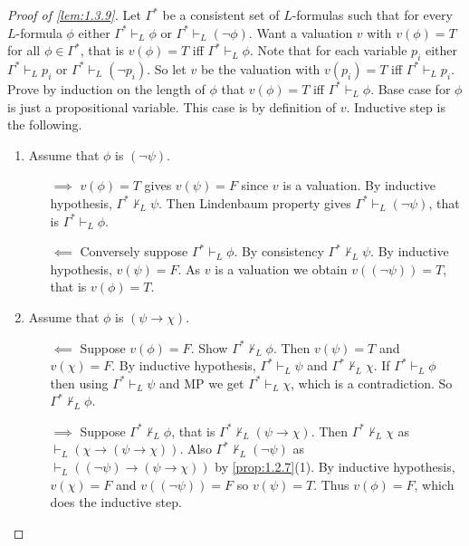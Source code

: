 \documentclass{article}
\newcommand{\rb}[1]{\left( #1 \right)}
\newcommand{\notb}[1]{\rb{\neg #1}}
\newcommand{\impb}[2]{\rb{#1 \rightarrow #2}}
\theoremstyle{definition}\newtheorem{definition}{Definition}[subsection]
\theoremstyle{definition}\newtheorem{remark}[definition]{Remark}
\theoremstyle{definition}\newtheorem*{example}{Example}
\theoremstyle{definition}\newtheorem*{note}{Note}
\begin{document}
\begin{proof}[Proof of \ref{lem:1.3.9}]
Let $ \Gamma^* $ be a consistent set of $ L $-formulas such that for every $ L $-formula $ \phi $ either $ \Gamma^* \vdash_L \phi $ or $ \Gamma^* \vdash_L \notb{\phi} $. Want a valuation $ v $ with $ v\rb{\phi} = T $ for all $ \phi \in \Gamma^* $, that is $ v\rb{\phi} = T $ iff $ \Gamma^* \vdash_L \phi $. Note that for each variable $ p_i $ either $ \Gamma^* \vdash_L p_i $ or $ \Gamma^* \vdash_L \notb{p_i} $. So let $ v $ be the valuation with $ v\rb{p_i} = T $ iff $ \Gamma^* \vdash_L p_i $. Prove by induction on the length of $ \phi $ that $ v\rb{\phi} = T $ iff $ \Gamma^* \vdash_L \phi $. Base case for $ \phi $ is just a propositional variable. This case is by definition of $ v $. Inductive step is the following.
\begin{enumerate}
\item Assume that $ \phi $ is $ \notb{\psi} $.
\begin{itemize}
\item[$ \implies $] $ v\rb{\phi} = T $ gives $ v\rb{\psi} = F $ since $ v $ is a valuation. By inductive hypothesis, $ \Gamma^* \not\vdash_L \psi $. Then Lindenbaum property gives $ \Gamma^* \vdash_L \notb{\psi} $, that is $ \Gamma^* \vdash_L \phi $.
\item[$ \impliedby $] Conversely suppose $ \Gamma^* \vdash_L \phi $. By consistency $ \Gamma^* \not\vdash_L \psi $. By inductive hypothesis, $ v\rb{\psi} = F $. As $ v $ is a valuation we obtain $ v\rb{\notb{\psi}} = T $, that is $ v\rb{\phi} = T $.
\end{itemize}
\item Assume that $ \phi $ is $ \impb{\psi}{\chi} $.
\begin{itemize}
\item[$ \impliedby $] Suppose $ v\rb{\phi} = F $. Show $ \Gamma^* \not\vdash_L \phi $. Then $ v\rb{\psi} = T $ and $ v\rb{\chi} = F $. By inductive hypothesis, $ \Gamma^* \vdash_L \psi $ and $ \Gamma^* \not\vdash_L \chi $. If $ \Gamma^* \vdash_L \phi $ then using $ \Gamma^* \vdash_L \psi $ and MP we get $ \Gamma^* \vdash_L \chi $, which is a contradiction. So $ \Gamma^* \not\vdash_L \phi $.
\item[$ \implies $] Suppose $ \Gamma^* \not\vdash_L \phi $, that is $ \Gamma^* \not\vdash_L \impb{\psi}{\chi} $. Then $ \Gamma^* \not\vdash_L \chi $ as $ \vdash_L \impb{\chi}{\impb{\psi}{\chi}} $. Also $ \Gamma^* \not\vdash_L \notb{\psi} $ as $ \vdash_L \impb{\notb{\psi}}{\impb{\psi}{\chi}} $ by \ref{prop:1.2.7}(1). By inductive hypothesis, $ v\rb{\chi} = F $ and $ v\rb{\notb{\psi}} = F $ so $ v\rb{\psi} = T $. Thus $ v\rb{\phi} = F $, which does the inductive step.
\end{itemize}
\end{enumerate}
\end{proof}
\end{document}
